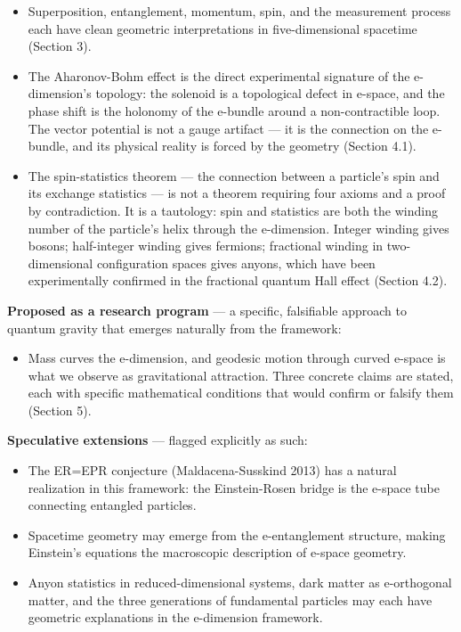 \documentclass[aps,prd,preprint,superscriptaddress,longbibliography,floatfix]{revtex4-2}
\theoremstyle{remark}
\begin{document}
\begin{itemize}
  \item Superposition, entanglement, momentum, spin, and the measurement process each have clean geometric interpretations in five-dimensional spacetime (Section 3).
  \item The Aharonov-Bohm effect is the direct experimental signature of the e-dimension's topology: the solenoid is a topological defect in e-space, and the phase shift is the holonomy of the e-bundle around a non-contractible loop. The vector potential is not a gauge artifact --- it is the connection on the e-bundle, and its physical reality is forced by the geometry (Section 4.1).
  \item The spin-statistics theorem --- the connection between a particle's spin and its exchange statistics --- is not a theorem requiring four axioms and a proof by contradiction. It is a tautology: spin and statistics are both the winding number of the particle's helix through the e-dimension. Integer winding gives bosons; half-integer winding gives fermions; fractional winding in two-dimensional configuration spaces gives anyons, which have been experimentally confirmed in the fractional quantum Hall effect (Section 4.2).
\end{itemize}

\textbf{Proposed as a research program} --- a specific, falsifiable approach to quantum gravity that emerges naturally from the framework:


\begin{itemize}
  \item Mass curves the e-dimension, and geodesic motion through curved e-space is what we observe as gravitational attraction. Three concrete claims are stated, each with specific mathematical conditions that would confirm or falsify them (Section 5).
\end{itemize}

\textbf{Speculative extensions} --- flagged explicitly as such:


\begin{itemize}
  \item The ER=EPR conjecture (Maldacena-Susskind 2013) has a natural realization in this framework: the Einstein-Rosen bridge is the e-space tube connecting entangled particles.
  \item Spacetime geometry may emerge from the e-entanglement structure, making Einstein's equations the macroscopic description of e-space geometry.
  \item Anyon statistics in reduced-dimensional systems, dark matter as e-orthogonal matter, and the three generations of fundamental particles may each have geometric explanations in the e-dimension framework.
\end{itemize}
\end{document}

